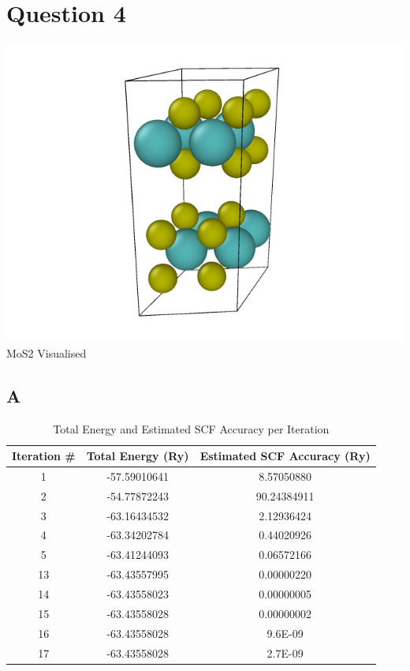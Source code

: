 \documentclass[11pt]{article}
\begin{document}
\section{Question 4}

\includegraphics[scale=0.5]{MoS2.png}\\
MoS2 Visualised\cite{noauthor_undated-ej}

\subsection{A}
\begin{table}[h!]
    \centering
    \begin{tabular}{|c|c|c|}
    \hline
    \textbf{Iteration \#} & \textbf{Total Energy (Ry)} & \textbf{Estimated SCF Accuracy (Ry)} \\
    \hline
    1  & -57.59010641 & 8.57050880 \\
    2  & -54.77872243 & 90.24384911 \\
    3  & -63.16434532 & 2.12936424 \\
    4  & -63.34202784 & 0.44020926 \\
    5  & -63.41244093 & 0.06572166 \\
    13 & -63.43557995 & 0.00000220 \\
    14 & -63.43558023 & 0.00000005 \\
    15 & -63.43558028 & 0.00000002 \\
    16 & -63.43558028 & 9.6E-09 \\
    17 & -63.43558028 & 2.7E-09 \\
    \hline
    \end{tabular}
    \caption{Total Energy and Estimated SCF Accuracy per Iteration}
    \label{tab:scf_accuracy}
\end{table}
\end{document}
